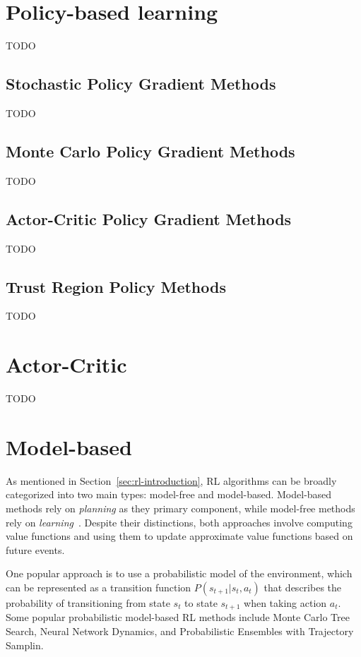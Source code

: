 \documentclass[../xlapes02]{subfiles}
\begin{document}
    \section{Policy-based learning}\label{sec:policy-based}
    TODO

    \subsection{Stochastic Policy Gradient Methods}\label{subsec:stochastic-policy-gradient-methods}
    TODO

    \subsection{Monte Carlo Policy Gradient Methods}\label{subsec:monte-carlo-policy-gradient-methods}
    TODO

    \subsection{Actor-Critic Policy Gradient Methods}\label{subsec:actor-critic-policy-gradient-methods}
    TODO

    \subsection{Trust Region Policy Methods}\label{subsec:trust-region-policy-methods}
    TODO


    \section{Actor-Critic}\label{sec:actor-critic}
    TODO


    \section{Model-based}\label{sec:model-based}
    As mentioned in Section~\cref{sec:rl-introduction}, RL algorithms can be broadly categorized into two main types: model-free and model-based. Model-based methods rely on \emph{planning} as they primary component, while model-free methods rely on \emph{learning}~\cite{sutton2018reinforcement}. Despite their distinctions, both approaches involve computing value functions and using them to update approximate value functions based on future events.

    One popular approach is to use a probabilistic model of the environment, which can be represented as a transition function $P(s_{t+1}|s_t, a_t)$ that describes the probability of transitioning from state $s_t$ to state $s_{t+1}$ when taking action $a_t$. Some popular probabilistic model-based RL methods include Monte Carlo Tree Search, Neural Network Dynamics, and Probabilistic Ensembles with Trajectory Samplin.
\end{document}
